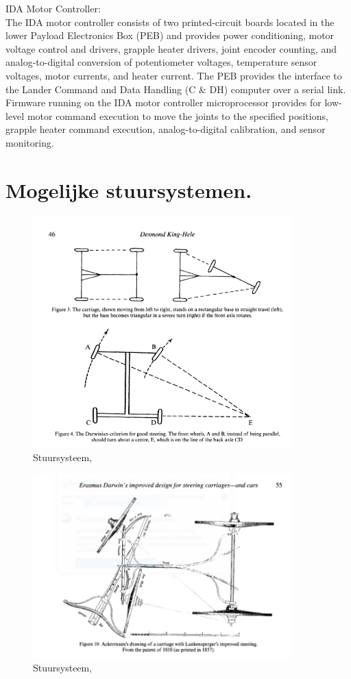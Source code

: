 IDA Motor Controller: \\
The IDA motor controller consists of two printed-circuit boards located in the lower Payload Electronics Box (PEB) and provides power conditioning, motor voltage control and drivers, grapple heater drivers, joint encoder counting, and analog-to-digital conversion of potentiometer voltages, temperature sensor voltages, motor currents, and heater current. The PEB provides the interface to the Lander Command and Data Handling (C \& DH) computer over a serial link. Firmware running on the IDA motor controller microprocessor provides for low-level motor command execution to move the joints to the specified positions, grapple heater command execution, analog-to-digital calibration, and sensor monitoring. \cite{r.g._bonitz_nguyen_kim_bonitz_folkner_golombek_olson_spohn_grott_et_al._1970}
\vspace{\baselineskip}

\section{Mogelijke stuursystemen.}
\vspace{\baselineskip}

\begin{figure}[H]
    \includegraphics[width=100mm]{06_bijlage_C/ackermann.PNG}
    \caption{Stuursysteem, \cite{king-hele_2002}}
    \label{fig:conceptscores9}
\end{figure}

\vspace{\baselineskip}

\begin{figure}[H]
    \includegraphics[width=100mm]{06_bijlage_C/Ackermann2.PNG}
    \caption{Stuursysteem, \cite{king-hele_2002}}
    \label{fig:conceptscores0}
\end{figure}
